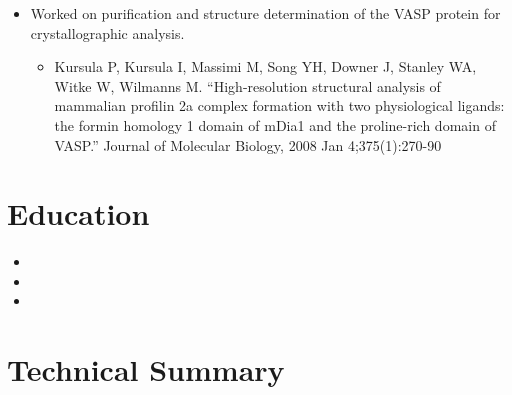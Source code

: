 \documentclass[11pt,a4paper,sans]{moderncv}        %
\begin{document}
\vspace{6pt}

\begin{itemize}

\item{}

  Worked on purification and structure determination of the VASP protein for crystallographic analysis.

  \begin{itemize}
    \item{Kursula P, Kursula I, Massimi M, Song YH, Downer J, Stanley WA, Witke W, Wilmanns M. “High-resolution structural analysis of mammalian profilin 2a complex formation with two physiological ligands: the formin homology 1 domain of mDia1 and the proline-rich domain of VASP.” Journal of Molecular Biology, 2008 Jan 4;375(1):270-90}
  \end{itemize}

\end{itemize}


\newpage


\section{Education}

\vspace{5pt}

\begin{itemize}
  \item{}
  \item{}
  \item{}
\end{itemize}


\vspace{10pt}


\section{Technical Summary}

\vspace{5pt}
\end{document}
